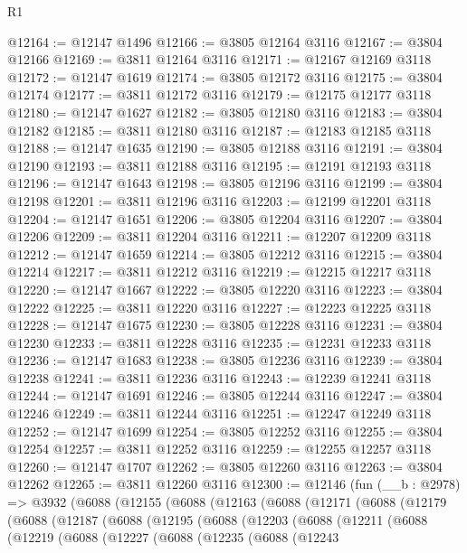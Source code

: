 \begin{lexlean}{R1}
\begin{coremodule}
@12164 := @12147 @1496
@12166 := @3805 @12164 @3116
@12167 := @3804 @12166
@12169 := @3811 @12164 @3116
@12171 := @12167 @12169 @3118
@12172 := @12147 @1619
@12174 := @3805 @12172 @3116
@12175 := @3804 @12174
@12177 := @3811 @12172 @3116
@12179 := @12175 @12177 @3118
@12180 := @12147 @1627
@12182 := @3805 @12180 @3116
@12183 := @3804 @12182
@12185 := @3811 @12180 @3116
@12187 := @12183 @12185 @3118
@12188 := @12147 @1635
@12190 := @3805 @12188 @3116
@12191 := @3804 @12190
@12193 := @3811 @12188 @3116
@12195 := @12191 @12193 @3118
@12196 := @12147 @1643
@12198 := @3805 @12196 @3116
@12199 := @3804 @12198
@12201 := @3811 @12196 @3116
@12203 := @12199 @12201 @3118
@12204 := @12147 @1651
@12206 := @3805 @12204 @3116
@12207 := @3804 @12206
@12209 := @3811 @12204 @3116
@12211 := @12207 @12209 @3118
@12212 := @12147 @1659
@12214 := @3805 @12212 @3116
@12215 := @3804 @12214
@12217 := @3811 @12212 @3116
@12219 := @12215 @12217 @3118
@12220 := @12147 @1667
@12222 := @3805 @12220 @3116
@12223 := @3804 @12222
@12225 := @3811 @12220 @3116
@12227 := @12223 @12225 @3118
@12228 := @12147 @1675
@12230 := @3805 @12228 @3116
@12231 := @3804 @12230
@12233 := @3811 @12228 @3116
@12235 := @12231 @12233 @3118
@12236 := @12147 @1683
@12238 := @3805 @12236 @3116
@12239 := @3804 @12238
@12241 := @3811 @12236 @3116
@12243 := @12239 @12241 @3118
@12244 := @12147 @1691
@12246 := @3805 @12244 @3116
@12247 := @3804 @12246
@12249 := @3811 @12244 @3116
@12251 := @12247 @12249 @3118
@12252 := @12147 @1699
@12254 := @3805 @12252 @3116
@12255 := @3804 @12254
@12257 := @3811 @12252 @3116
@12259 := @12255 @12257 @3118
@12260 := @12147 @1707
@12262 := @3805 @12260 @3116
@12263 := @3804 @12262
@12265 := @3811 @12260 @3116
@12300 := @12146
    (fun (__b : @2978) =>
    @3932
      (@6088
        (@12155
          (@6088
            (@12163
              (@6088
                (@12171
                  (@6088
                    (@12179
                      (@6088
                        (@12187
                          (@6088
                            (@12195
                              (@6088
                                (@12203
                                  (@6088
                                    (@12211
                                      (@6088
                                        (@12219
                                          (@6088
                                            (@12227
                                              (@6088
                                                (@12235
                                                  (@6088
                                                    (@12243

\end{coremodule}
\end{lexlean}
